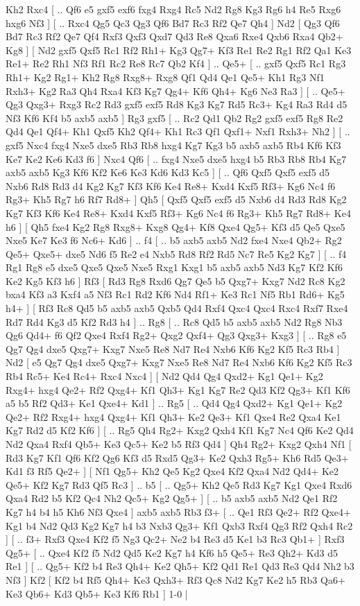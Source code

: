 Kh2   Rxc4 [ .. Qf6  e5 gxf5  exf6 fxg4  Rxg4 Rc5  Nd2 Rg8  Kg3 Rg6  h4 Re5  Rxg6 hxg6  Nf3   ]  [ .. Rxc4  Qg5 Qc3  Qg3 Qf6  Bd7 Rc3  Rf2 Qe7  Qh4   ]  Nd2 [  Qg3 Qf6  Bd7 Rc3  Rf2 Qe7  Qf4 Rxf3  Qxf3 Qxd7  Qd3 Re8  Qxa6 Rxe4  Qxb6 Rxa4  Qb2+ Kg8   ]  [  Nd2 gxf5  Qxf5 Rc1  Rf2 Rh1+  Kg3 Qg7+  Kf3 Re1  Re2 Rg1  Rf2 Qa1  Ke3 Re1+  Re2 Rh1  Nf3 Rf1  Rc2 Re8  Rc7 Qb2  Kf4   ] .. Qe5+ [ .. gxf5  Qxf5 Rc1  Rg3 Rh1+  Kg2 Rg1+  Kh2 Rg8  Rxg8+ Rxg8  Qf1 Qd4  Qe1 Qe5+  Kh1 Rg3  Nf1 Rxh3+  Kg2 Ra3  Qh4 Rxa4  Kf3 Kg7  Qg4+ Kf6  Qh4+ Kg6  Ne3 Ra3   ]  [ .. Qe5+  Qg3 Qxg3+  Rxg3 Rc2  Rd3 gxf5  exf5 Rd8  Kg3 Kg7  Rd5 Rc3+  Kg4 Ra3  Rd4 d5  Nf3 Kf6  Kf4 b5  axb5 axb5   ]  Rg3   gxf5 [ .. Rc2  Qd1 Qb2  Rg2 gxf5  exf5 Rg8  Re2 Qd4  Qe1 Qf4+  Kh1 Qxf5  Kh2 Qf4+  Kh1 Rc3  Qf1 Qxf1+  Nxf1 Rxh3+  Nh2   ]  [ .. gxf5  Nxc4 fxg4  Nxe5 dxe5  Rb3 Rb8  hxg4 Kg7  Kg3 b5  axb5 axb5  Rb4 Kf6  Kf3 Ke7  Ke2 Ke6  Kd3 f6   ]  Nxc4   Qf6 [ .. fxg4  Nxe5 dxe5  hxg4 b5  Rb3 Rb8  Rb4 Kg7  axb5 axb5  Kg3 Kf6  Kf2 Ke6  Ke3 Kd6  Kd3 Kc5   ]  [ .. Qf6  Qxf5 Qxf5  exf5 d5  Nxb6 Rd8  Rd3 d4  Kg2 Kg7  Kf3 Kf6  Ke4 Re8+  Kxd4 Kxf5  Rf3+ Kg6  Nc4 f6  Rg3+ Kh5  Rg7 h6  Rf7 Rd8+   ]  Qh5 [  Qxf5 Qxf5  exf5 d5  Nxb6 d4  Rd3 Rd8  Kg2 Kg7  Kf3 Kf6  Ke4 Re8+  Kxd4 Kxf5  Rf3+ Kg6  Nc4 f6  Rg3+ Kh5  Rg7 Rd8+  Ke4 h6   ]  [  Qh5 fxe4  Kg2 Rg8  Rxg8+ Kxg8  Qg4+ Kf8  Qxe4 Qg5+  Kf3 d5  Qe5 Qxe5  Nxe5 Ke7  Ke3 f6  Nc6+ Kd6   ] .. f4 [ .. b5  axb5 axb5  Nd2 fxe4  Nxe4 Qb2+  Rg2 Qe5+  Qxe5+ dxe5  Nd6 f5  Re2 e4  Nxb5 Rd8  Rf2 Rd5  Nc7 Re5  Kg2 Kg7   ]  [ .. f4  Rg1 Rg8  e5 dxe5  Qxe5 Qxe5  Nxe5 Rxg1  Kxg1 b5  axb5 axb5  Nd3 Kg7  Kf2 Kf6  Ke2 Kg5  Kf3 h6   ]  Rf3 [  Rd3 Rg8  Rxd6 Qg7  Qe5 b5  Qxg7+ Kxg7  Nd2 Rc8  Kg2 bxa4  Kf3 a3  Kxf4 a5  Nf3 Rc1  Rd2 Kf6  Nd4 Rf1+  Ke3 Rc1  Nf5 Rb1  Rd6+ Kg5  h4+   ]  [  Rf3 Rc8  Qd5 b5  axb5 axb5  Qxb5 Qd4  Rxf4 Qxc4  Qxc4 Rxc4  Rxf7 Rxe4  Rd7 Rd4  Kg3 d5  Kf2 Rd3  h4   ] .. Rg8 [ .. Rc8  Qd5 b5  axb5 axb5  Nd2 Rg8  Nb3 Qg6  Qd4+ f6  Qf2 Qxe4  Rxf4 Rg2+  Qxg2 Qxf4+  Qg3 Qxg3+  Kxg3   ]  [ .. Rg8  e5 Qg7  Qg4 dxe5  Qxg7+ Kxg7  Nxe5 Re8  Nd7 Re4  Nxb6 Kf6  Kg2 Kf5  Rc3 Rb4   ]  Nd2 [  e5 Qg7  Qg4 dxe5  Qxg7+ Kxg7  Nxe5 Re8  Nd7 Re4  Nxb6 Kf6  Kg2 Kf5  Rc3 Rb4  Rc5+ Ke4  Rc4+ Rxc4  Nxc4   ]  [  Nd2 Qd4  Qg4 Qxd2+  Kg1 Qe1+  Kg2 Rxg4+  hxg4 Qe2+  Rf2 Qxg4+  Kf1 Qh3+  Kg1 Kg7  Re2 Qd3  Kf2 Qg3+  Kf1 Kf6  a5 b5  Rf2 Qd3+  Ke1 Qxe4+  Kd1   ] .. Rg5 [ .. Qd4  Qg4 Qxd2+  Kg1 Qe1+  Kg2 Qe2+  Rf2 Rxg4+  hxg4 Qxg4+  Kf1 Qh3+  Ke2 Qe3+  Kf1 Qxe4  Re2 Qxa4  Ke1 Kg7  Rd2 d5  Kf2 Kf6   ]  [ .. Rg5  Qh4 Rg2+  Kxg2 Qxh4  Kf1 Kg7  Nc4 Qf6  Ke2 Qd4  Nd2 Qxa4  Rxf4 Qb5+  Ke3 Qc5+  Ke2 b5  Rf3 Qd4   ]  Qh4   Rg2+    Kxg2   Qxh4    Nf1 [  Rd3 Kg7  Kf1 Qf6  Kf2 Qg6  Kf3 d5  Rxd5 Qg3+  Ke2 Qxh3  Rg5+ Kh6  Rd5 Qe3+  Kd1 f3  Rf5 Qe2+   ]  [  Nf1 Qg5+  Kh2 Qe5  Kg2 Qxe4  Kf2 Qxa4  Nd2 Qd4+  Ke2 Qe5+  Kf2 Kg7  Rd3 Qf5  Rc3   ] .. b5 [ .. Qg5+  Kh2 Qe5  Rd3 Kg7  Kg1 Qxe4  Rxd6 Qxa4  Rd2 b5  Kf2 Qc4  Nh2 Qc5+  Kg2 Qg5+   ]  [ .. b5  axb5 axb5  Nd2 Qe1  Rf2 Kg7  h4 b4  h5 Kh6  Nf3 Qxe4   ]  axb5   axb5    Rb3   f3+ [ .. Qe1  Rf3 Qe2+  Rf2 Qxe4+  Kg1 b4  Nd2 Qd3  Kg2 Kg7  h4 b3  Nxb3 Qg3+  Kf1 Qxb3  Rxf4 Qg3  Rf2 Qxh4  Rc2   ]  [ .. f3+  Rxf3 Qxe4  Kf2 f5  Ng3 Qc2+  Ne2 b4  Re3 d5  Ke1 b3  Rc3 Qb1+   ]  Rxf3   Qg5+ [ .. Qxe4  Kf2 f5  Nd2 Qd5  Ke2 Kg7  h4 Kf6  h5 Qe5+  Re3 Qh2+  Kd3 d5  Re1   ]  [ .. Qg5+  Kf2 b4  Re3 Qh4+  Ke2 Qh5+  Kf2 Qd1  Re1 Qd3  Re3 Qd4  Nh2 b3  Nf3   ]  Kf2    [  Kf2 b4  Rf5 Qh4+  Ke3 Qxh3+  Rf3 Qc8  Nd2 Kg7  Ke2 h5  Rb3 Qa6+  Ke3 Qb6+  Kd3 Qb5+  Ke3 Kf6  Rb1   ] 1-0  |

